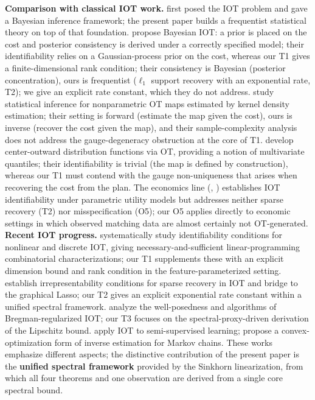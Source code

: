 \documentclass[11pt,a4paper]{article}
\theoremstyle{remark}
\begin{document}
\textbf{Comparison with classical IOT work.} \cite{stuart2020inverse} first posed the IOT
problem and gave a Bayesian inference framework; the present paper builds a frequentist
statistical theory on top of that foundation. \cite{vacher2021bayesian} propose Bayesian
IOT: a prior is placed on the cost and posterior consistency is derived under a correctly
specified model; their identifiability relies on a Gaussian-process prior on the cost,
whereas our T1 gives a finite-dimensional rank condition; their consistency is Bayesian
(posterior concentration), ours is frequentist ($\ell_1$ support recovery with an
exponential rate, T2); we give an explicit rate constant, which they do not address.
\cite{korba2021statistical} study statistical inference for nonparametric OT maps estimated
by kernel density estimation; their setting is forward (estimate the map given the cost),
ours is inverse (recover the cost given the map), and their sample-complexity analysis does
not address the gauge-degeneracy obstruction at the core of T1. \cite{hallin2021center}
develop center-outward distribution functions via OT, providing a notion of multivariate
quantiles; their identifiability is trivial (the map is defined by construction), whereas
our T1 must contend with the gauge non-uniqueness that arises when recovering the cost from
the plan. The economics line (\cite{dupuy2014personality}, \cite{galichon2018optimal})
establishes IOT identifiability under parametric utility models but addresses neither
sparse recovery (T2) nor misspecification (O5); our O5 applies directly to economic
settings in which observed matching data are almost certainly not OT-generated.
\textbf{Recent IOT progress.} \cite{gonzalez2024_nonlinear, gonzalez2024_finite}
systematically study identifiability conditions for nonlinear and discrete IOT, giving
necessary-and-sufficient linear-programming combinatorial characterizations; our T1
supplements these with an explicit dimension bound and rank condition in the
feature-parameterized setting. \cite{peyre2024_sparsistency} establish irrepresentability
conditions for sparse recovery in IOT and bridge to the graphical Lasso; our T2 gives an
explicit exponential rate constant within a unified spectral framework.
\cite{bao2025_wellposedness} analyze the well-posedness and algorithms of
Bregman-regularized IOT; our T3 focuses on the spectral-proxy-driven derivation of the
Lipschitz bound. \cite{persiianov2025_inverse} apply IOT to semi-supervised learning;
\cite{mascherpa2025_convex} propose a convex-optimization form of inverse estimation for
Markov chains. These works emphasize different aspects; the distinctive contribution of the
present paper is the \textbf{unified spectral framework} provided by the Sinkhorn
linearization, from which all four theorems and one observation are derived from a single
core spectral bound.
\end{document}
